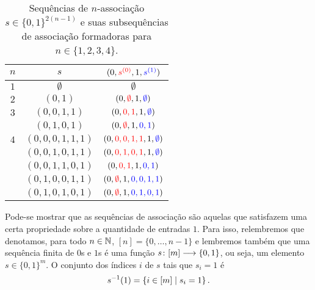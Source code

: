 \begin{table}
	\centering

	\begin{tabular}{c c c @{}}
		\toprule
		$n$		& $s$				& $(0,{\color{vermelho} s^{(0)}},1,{\color{azul} s^{(1)}})$	\\
		\midrule
		$1$		& $\emptyset$		& $\emptyset$	\\
		$2$		& $(0,1)$			& $(0,{\color{vermelho} \emptyset},1,{\color{azul} \emptyset})$	\\
		$3$		& $(0,0,1,1)$		& $(0,{\color{vermelho} 0,1},1,{\color{azul} \emptyset})$	\\
				& $(0,1,0,1)$		& $(0,{\color{vermelho} \emptyset},1,{\color{azul} 0,1})$	\\
		$4$		& $(0,0,0,1,1,1)$	& $(0,{\color{vermelho} 0,0,1,1},1,{\color{azul} \emptyset})$	\\
				& $(0,0,1,0,1,1)$	& $(0,{\color{vermelho} 0,1,0,1},1,{\color{azul} \emptyset})$	\\
				& $(0,0,1,1,0,1)$	& $(0,{\color{vermelho} 0,1},1,{\color{azul} 0,1})$		\\
				& $(0,1,0,0,1,1)$	& $(0,{\color{vermelho} \emptyset},1,{\color{azul} 0,0,1,1})$	\\
				& $(0,1,0,1,0,1)$	& $(0,{\color{vermelho} \emptyset},1,{\color{azul} 0,1,0,1})$	\\
		\bottomrule
	\end{tabular}

	\caption[Sequências de associação]{Sequências de $n$-associação $s \in \{0,1\}^{2(n-1)}$ e suas subsequências de associação formadoras para $n \in \{1,2,3,4\}$.}
	\label{tab:sequenciasdeassociacao}
\end{table}

Pode-se mostrar que as sequências de associação são aquelas que satisfazem uma certa propriedade sobre a quantidade de entradas $1$. Para isso, relembremos que denotamos, para todo $n \in \mathbb{N}$, $[n] = \{0,\ldots,n-1\}$ e lembremos também que uma sequência finita de $0$s e $1$s é uma função $s\colon \allowbreak [m] \longrightarrow \{0, 1\}$, ou seja, um elemento $s \in \{0,1\}^m$. O conjunto dos índices $i$ de $s$ tais que $s_i=1$ é
	\begin{equation*}
	s^{-1}(1) = \left\{ i \in [m] \;\middle\vert\; s_i=1 \right\}.
	\end{equation*}

